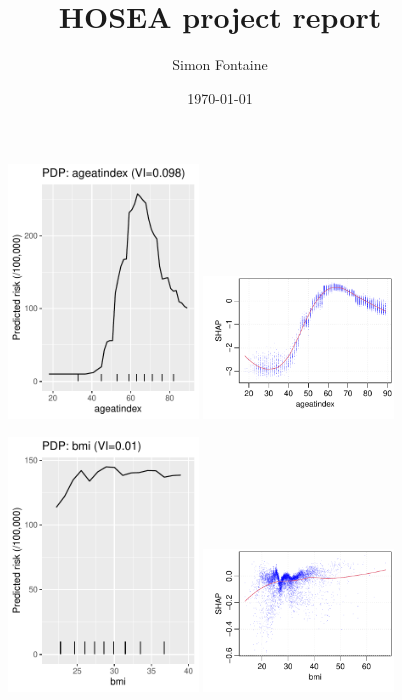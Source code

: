 \documentclass[12pt]{article}
\title{HOSEA project report}
\author{Simon Fontaine}
\date{\today}
\begin{document}


\begin{figure}[h]
\centering
\includegraphics[width=0.45\textwidth]{figures/pdp/ageatindex.pdf}
\includegraphics[width=0.45\textwidth]{figures/shap/ageatindex.pdf}
\end{figure}
\begin{figure}[h]
\centering
\includegraphics[width=0.45\textwidth]{figures/pdp/bmi.pdf}
\includegraphics[width=0.45\textwidth]{figures/shap/bmi.pdf}
\end{figure}
\end{document}
